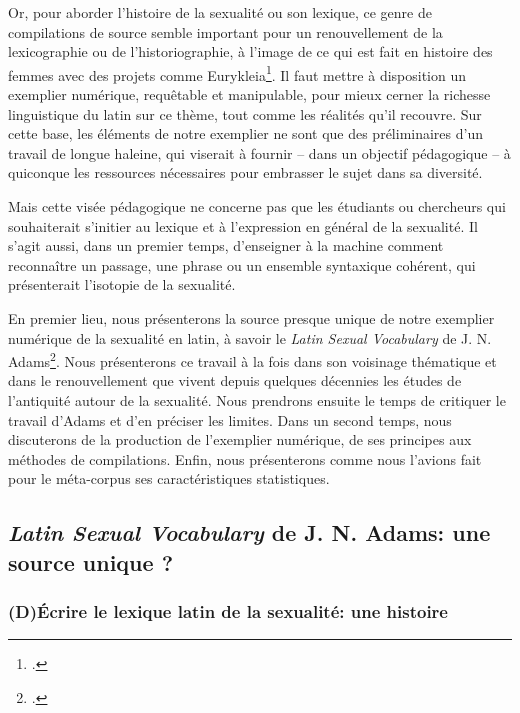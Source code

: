 Or, pour aborder l'histoire de la sexualité ou son lexique, ce genre de compilations de source semble important pour un renouvellement de la lexicographie ou de l'historiographie, à l'image de ce qui est fait en histoire des femmes avec des projets comme Eurykleia\footcite{noauthor_eurykleia_nodate}. Il faut mettre à disposition un exemplier numérique, requêtable et manipulable, pour mieux cerner la richesse linguistique du latin sur ce thème, tout comme les réalités qu'il recouvre. Sur cette base, les éléments de notre exemplier ne sont que des préliminaires d'un travail de longue haleine, qui viserait à fournir -- dans un objectif pédagogique -- à quiconque les ressources nécessaires pour embrasser le sujet dans sa diversité.

Mais cette visée pédagogique ne concerne pas que les étudiants ou chercheurs qui souhaiterait s'initier au lexique et à l'expression en général de la sexualité. Il s'agit aussi, dans un premier temps, d'enseigner à la machine comment reconnaître un passage, une phrase ou un ensemble syntaxique cohérent, qui présenterait l'isotopie de la sexualité.

En premier lieu, nous présenterons la source presque unique de notre exemplier numérique de la sexualité en latin, à savoir le \textit{Latin Sexual Vocabulary} de J. N. Adams\footcite{adams}. Nous présenterons ce travail à la fois dans son voisinage thématique et dans le renouvellement que vivent depuis quelques décennies les études de l'antiquité autour de la sexualité. Nous prendrons ensuite le temps de critiquer le travail d'Adams et d'en préciser les limites. Dans un second temps, nous discuterons de la production de l'exemplier numérique, de ses principes aux méthodes de compilations. Enfin, nous présenterons comme nous l'avions fait pour le méta-corpus ses caractéristiques statistiques.

\subsection{\textit{Latin Sexual Vocabulary} de J. N. Adams: une source unique ?}


% 

\subsubsection{(D)Écrire le lexique latin de la sexualité: une histoire}


